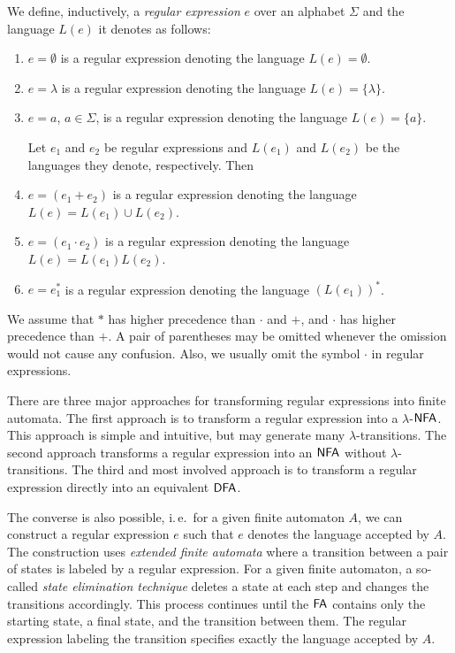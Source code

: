 We define, inductively, a \emph{regular expression} $e$ over an alphabet $\Sigma$ and the language $L(e)$ it denotes as follows:

\begin{enumerate}
\item $e = \emptyset$ is a regular expression denoting the language $L(e) = \emptyset$.
\item $e = \lambda$ is a regular expression denoting the language $L(e) = \{\lambda\}$.
\item $e = a$, $a \in \Sigma$, is a regular expression denoting the language $L(e) = \{a\}$.

Let $e_1$ and $e_2$ be regular expressions and $L(e_1)$ and $L(e_2)$ be the languages they
denote, respectively. Then
\item $e = (e_1 + e_2)$ is a regular expression denoting the language $L(e) = L(e_1) \cup L(e_2)$.
\item $e = (e_1 \cdot e_2)$ is a regular expression denoting the language $L(e) = L(e_1) L(e_2)$.
\item $e = e_1^*$ is a regular expression denoting the language $(L(e_1))^*$.
\end{enumerate}

We assume that $*$ has higher precedence than $\cdot$ and $+$, and $\cdot$ has higher precedence than $+$. A pair of parentheses may be omitted whenever the omission would not cause any confusion. Also, we usually omit the symbol $\cdot$ in regular expressions.

There are three major approaches for transforming regular expressions into finite automata. The first approach is to transform a regular expression into a \index{$\lambda$-$\NFA$} $\lambda$-$\NFA$. This approach is simple and intuitive, but may generate many $\lambda$-transitions. The second approach transforms a regular expression into an \index{$\NFA$}$\NFA$ without $\lambda$-transitions. The third and most involved approach is to transform a regular expression directly into an equivalent \index{$\DFA$}$\DFA$.

The converse is also possible, i.\,e.\ for a given finite automaton $A$, we can construct a regular expression $e$ such that $e$ denotes the language accepted by $A$. The construction uses \emph{extended finite automata} where a transition between a pair of states is labeled by a regular expression. For a given finite automaton, a so-called \emph{state elimination technique} deletes a state at each step and changes the transitions accordingly. This process continues until the \index{$\FA$}$\FA$ contains only the starting state, a final state, and the transition between them. The regular expression labeling the transition specifies exactly the language accepted by $A$.

